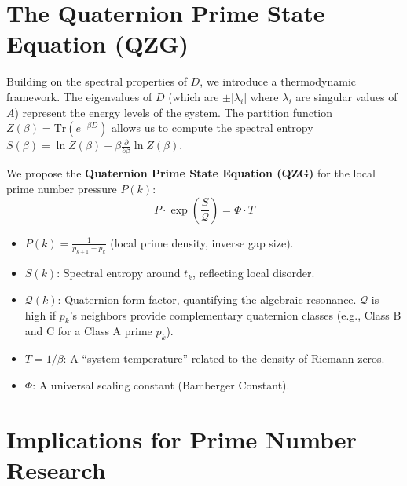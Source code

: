 \documentclass[11pt,a4paper]{article}
\newcommand{\entropy}{S}
\newcommand{\formfactor}{\mathcal{Q}}
\newcommand{\pressure}{P}
\newcommand{\temperature}{T}
\newcommand{\bamberger}{\Phi}
\theoremstyle{definition}
\begin{document}
\section{The Quaternion Prime State Equation (QZG)}
\label{sec:qzg}
Building on the spectral properties of $D$, we introduce a thermodynamic framework. The eigenvalues of $D$ (which are $\pm |\lambda_i|$ where $\lambda_i$ are singular values of $A$) represent the energy levels of the system. The partition function $Z(\beta) = \text{Tr}(e^{-\beta D})$ allows us to compute the spectral entropy $\entropy(\beta) = \ln Z(\beta) - \beta \frac{\partial}{\partial \beta} \ln Z(\beta)$.

We propose the \textbf{Quaternion Prime State Equation (QZG)} for the local prime number pressure $\pressure(k)$:
\begin{equation}
\label{eq:qzg}
\pressure \cdot \exp\left(\frac{\entropy}{\formfactor}\right) = \bamberger \cdot \temperature
\end{equation}
\begin{itemize}
    \item $\pressure(k) = \frac{1}{p_{k+1} - p_k}$ (local prime density, inverse gap size).
    \item $\entropy(k)$: Spectral entropy around $t_k$, reflecting local disorder.
    \item $\formfactor(k)$: Quaternion form factor, quantifying the algebraic resonance. $\formfactor$ is high if $p_k$'s neighbors provide complementary quaternion classes (e.g., Class B and C for a Class A prime $p_k$).
    \item $\temperature = 1/\beta$: A ``system temperature'' related to the density of Riemann zeros.
    \item $\bamberger$: A universal scaling constant (Bamberger Constant).
\end{itemize}

\section{Implications for Prime Number Research}
\label{sec:implications}
\end{document}
